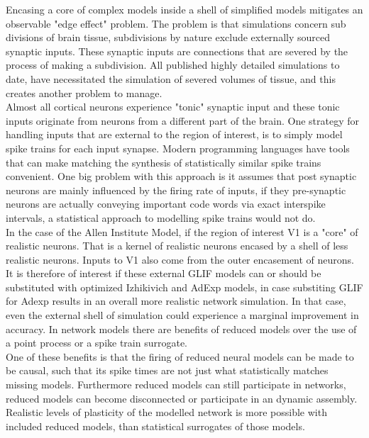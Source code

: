 Encasing a core of complex models inside a shell of simplified models mitigates an observable "edge effect" problem. The problem is that simulations concern sub divisions of brain tissue, subdivisions by nature exclude externally sourced synaptic inputs. These synaptic inputs are connections that are severed by the process of making a subdivision. All published highly detailed simulations to date, have necessitated the simulation of severed volumes of tissue, and this creates another problem to manage.\\
Almost all cortical neurons experience "tonic" synaptic input and these tonic inputs originate from neurons from a different part of the brain. One strategy for handling inputs that are external to the region of interest, is to simply model spike trains for each input synapse. Modern programming languages have tools that can make matching the synthesis of statistically similar spike trains convenient. One big problem with this approach is it assumes that post synaptic neurons are mainly influenced by the firing rate of inputs, if they pre-synaptic neurons are actually conveying important code words via exact interspike intervals, a statistical approach to modelling spike trains would not do.\\

In the case of the Allen Institute Model, if the region of interest V1 is a "core" of realistic neurons. That is a kernel of realistic neurons encased by a shell of less realistic neurons. Inputs to V1 also come from the outer encasement of neurons. It is therefore of interest if these external GLIF models can or should be substituted with optimized Izhikivich and AdExp models, in case substiting GLIF for Adexp results in an overall more realistic network simulation. In that case, even the external shell of simulation could experience a marginal improvement in accuracy. In network models there are benefits of reduced models over the use of a point process or a spike train surrogate.\\


One of these benefits is that the firing of reduced neural models can be made to be causal, such that its spike times are not just what statistically matches missing models. Furthermore reduced models can still participate in networks, reduced models can become disconnected or participate in an dynamic assembly. Realistic levels of plasticity of the modelled network is more possible with included reduced models, than statistical surrogates of those models.


